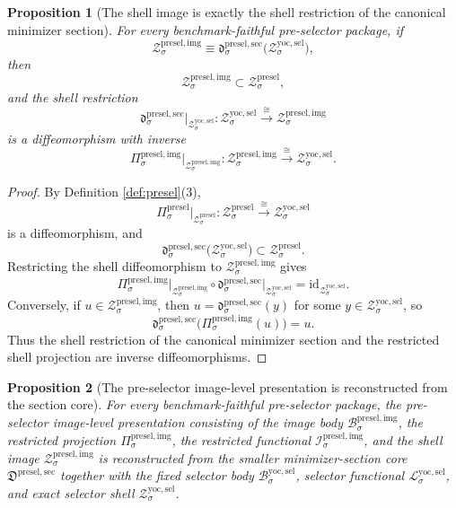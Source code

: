 \documentclass[11pt]{article}
\newcommand{\YoctoSelectorBody}[1]{\mathcal B_{#1}^{\mathrm{yoc,sel}}}
\newcommand{\YoctoSelectorFunctional}[1]{\mathscr L_{#1}^{\mathrm{yoc,sel}}}
\newcommand{\YoctoSelectorShell}[1]{\mathcal Z_{#1}^{\mathrm{yoc,sel}}}
\newcommand{\PreSelectorProj}[1]{\Pi_{#1}^{\mathrm{presel}}}
\newcommand{\PreSelectorShell}[1]{\mathcal Z_{#1}^{\mathrm{presel}}}
\newcommand{\PreSelectorMinSectionCore}{\mathfrak D^{\mathrm{presel,sec}}}
\newcommand{\PreSelectorMinSection}[1]{\mathfrak d_{#1}^{\mathrm{presel,sec}}}
\newcommand{\PreSelectorImgBody}[1]{\mathcal B_{#1}^{\mathrm{presel,img}}}
\newcommand{\PreSelectorImgProj}[1]{\Pi_{#1}^{\mathrm{presel,img}}}
\newcommand{\PreSelectorImgFunctional}[1]{\mathscr I_{#1}^{\mathrm{presel,img}}}
\newcommand{\PreSelectorImgShell}[1]{\mathcal Z_{#1}^{\mathrm{presel,img}}}
\newtheorem{proposition}{Proposition}
\begin{document}
\begin{proposition}[The shell image is exactly the shell restriction of the canonical minimizer section]
\label{prop:reconstructshell}
For every benchmark-faithful pre-selector package, if
\[
\PreSelectorImgShell{\sigma}
\equiv
\PreSelectorMinSection{\sigma}\bigl(\YoctoSelectorShell{\sigma}\bigr),
\]
then
\[
\PreSelectorImgShell{\sigma}
\subset
\PreSelectorShell{\sigma},
\]
and the shell restriction
\[
\PreSelectorMinSection{\sigma}\big|_{\YoctoSelectorShell{\sigma}}
:
\YoctoSelectorShell{\sigma}\xrightarrow{\cong}\PreSelectorImgShell{\sigma}
\]
is a diffeomorphism with inverse
\[
\PreSelectorImgProj{\sigma}\big|_{\PreSelectorImgShell{\sigma}}
:
\PreSelectorImgShell{\sigma}\xrightarrow{\cong}\YoctoSelectorShell{\sigma}.
\]
\end{proposition}

\begin{proof}
By Definition \ref{def:presel}(3),
\[
\PreSelectorProj{\sigma}\big|_{\PreSelectorShell{\sigma}}
:
\PreSelectorShell{\sigma}\xrightarrow{\cong}\YoctoSelectorShell{\sigma}
\]
is a diffeomorphism, and
\[
\PreSelectorMinSection{\sigma}\bigl(\YoctoSelectorShell{\sigma}\bigr)
\subset
\PreSelectorShell{\sigma}.
\]
Restricting the shell diffeomorphism to \(\PreSelectorImgShell{\sigma}\) gives
\[
\PreSelectorImgProj{\sigma}\big|_{\PreSelectorImgShell{\sigma}}
\circ
\PreSelectorMinSection{\sigma}\big|_{\YoctoSelectorShell{\sigma}}
=
\mathrm{id}_{\YoctoSelectorShell{\sigma}}.
\]
Conversely, if \(u\in\PreSelectorImgShell{\sigma}\), then \(u=\PreSelectorMinSection{\sigma}(y)\) for some \(y\in\YoctoSelectorShell{\sigma}\), so
\[
\PreSelectorMinSection{\sigma}\bigl(\PreSelectorImgProj{\sigma}(u)\bigr)
=
u.
\]
Thus the shell restriction of the canonical minimizer section and the restricted shell projection are inverse diffeomorphisms.
\end{proof}

\begin{proposition}[The pre-selector image-level presentation is reconstructed from the section core]
\label{prop:reconstructimage}
For every benchmark-faithful pre-selector package, the pre-selector image-level presentation consisting of the image body \(\PreSelectorImgBody{\sigma}\), the restricted projection \(\PreSelectorImgProj{\sigma}\), the restricted functional \(\PreSelectorImgFunctional{\sigma}\), and the shell image \(\PreSelectorImgShell{\sigma}\) is reconstructed from the smaller minimizer-section core \(\PreSelectorMinSectionCore\) together with the fixed selector body \(\YoctoSelectorBody{\sigma}\), selector functional \(\YoctoSelectorFunctional{\sigma}\), and exact selector shell \(\YoctoSelectorShell{\sigma}\).
\end{proposition}
\end{document}
